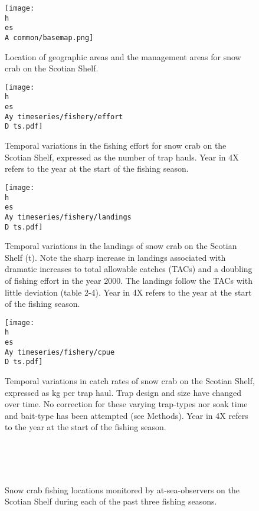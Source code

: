 \documentclass[11pt]{article}
\newcommand{\D}{.}
\newcommand{\h}{C:/} %
\newcommand{\es}{bio.data/bio.snowcrab/} %
\newcommand{\Ay}{assessments/2017/}
\newcommand{\A}{assessments/}
\newcommand{\m}{output/maps/} %
\newcommand{\yr}{2017}
\newcommand{\yrminusone}{2016}
\newcommand{\yrminustwo}{2015}
\begin{document}
\begin{figure}
    \texttt{[image: \\h \\es \\A common/basemap.png]}
    \caption{Location of geographic areas and the management areas for snow crab on the Scotian Shelf.}
  \end{figure}
\clearpage




\begin{figure}
    \texttt{[image: \\h \\es \\Ay timeseries/fishery/effort\\D ts.pdf]}
    \caption{Temporal variations in the fishing effort for snow crab on the Scotian Shelf, expressed as the number of trap hauls. Year in 4X refers to the year at the start of the fishing season.}
\end{figure}
\clearpage



\begin{figure}
    \texttt{[image: \\h \\es \\Ay timeseries/fishery/landings\\D ts.pdf]}
    \caption{Temporal variations in the landings of snow crab on the Scotian Shelf (t). Note the sharp increase in landings associated with dramatic increases to total allowable catches (TACs) and a doubling of fishing effort in the year 2000. The landings follow the TACs with little deviation (table 2-4). Year in 4X refers to the year at the start of the fishing season.}
\end{figure}
\clearpage



\begin{figure}
    \texttt{[image: \\h \\es \\Ay timeseries/fishery/cpue\\D ts.pdf]}
    \caption{Temporal variations in catch rates of snow crab on the Scotian Shelf, expressed as kg per trap haul. Trap design and size have changed over time. No correction for these varying trap-types nor soak time and bait-type has been attempted (see Methods). Year in 4X refers to the year at the start of the fishing season.}
\end{figure}
\clearpage



\begin{figure}
    \centering
   \\
  \\
    \\
  \caption{Snow crab fishing locations monitored by at-sea-observers on the Scotian Shelf during each of the past three fishing seasons.}
\end{figure}
\clearpage
\end{document}
